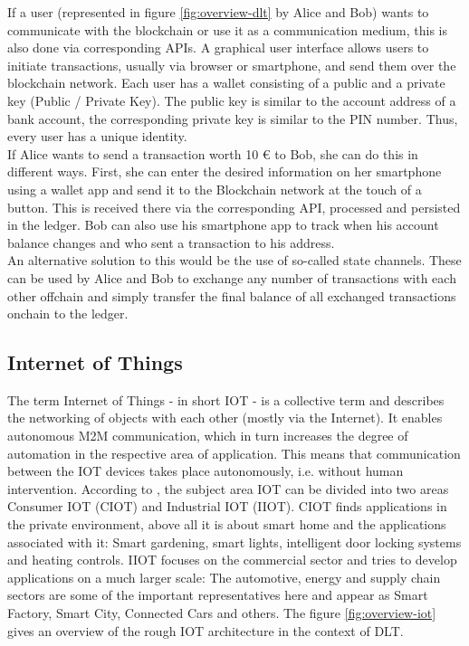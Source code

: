 \documentclass[conference]{IEEEtran}
\begin{document}
If a user (represented in figure \ref{fig:overview-dlt} by Alice and Bob) wants to communicate with the blockchain or use it as a communication medium, this is also done via corresponding APIs. A graphical user interface allows users to initiate transactions, usually via browser or smartphone, and send them over the blockchain network. Each user has a wallet consisting of a public and a private key (Public / Private Key). The public key is similar to the account address of a bank account, the corresponding private key is similar to the PIN number. Thus, every user has a unique identity.\\
If Alice wants to send a transaction worth 10 € to Bob, she can do this in different ways. First, she can enter the desired information on her smartphone using a wallet app and send it to the Blockchain network at the touch of a button. This is received there via the corresponding API, processed and persisted in the ledger. Bob can also use his smartphone app to track when his account balance changes and who sent a transaction to his address.\\
An alternative solution to this would be the use of so-called state channels. These can be used by Alice and Bob to exchange any number of transactions with each other offchain and simply transfer the final balance of all exchanged transactions onchain to the ledger.\\


\subsection{Internet of Things}
The term Internet of Things - in short IOT - is a collective term and describes the networking of objects with each other (mostly via the Internet). It enables autonomous M2M communication, which in turn increases the degree of automation in the respective area of application. This means that communication between the IOT devices takes place autonomously, i.e. without human intervention. According to \cite{deloitte2018}, the subject area IOT can be divided into two areas Consumer IOT (CIOT) and Industrial IOT (IIOT). CIOT finds applications in the private environment, above all it is about smart home and the applications associated with it: Smart gardening, smart lights, intelligent door locking systems and heating controls. IIOT focuses on the commercial sector and tries to develop applications on a much larger scale: The automotive, energy and supply chain sectors are some of the important representatives here and appear as Smart Factory, Smart City, Connected Cars and others. The figure \ref{fig:overview-iot} gives an overview of the rough IOT architecture in the context of DLT.
\end{document}
